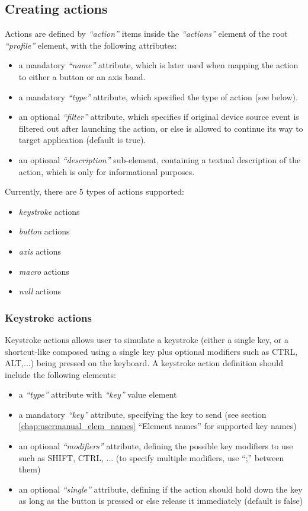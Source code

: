 \subsection{Creating actions}
Actions are defined by \emph{``action''} items inside the \emph{``actions''} element of the root \emph{``profile''} element, with the following attributes:
\begin{itemize}
	\item a mandatory \emph{``name''} attribute, which is later used when mapping the action to either a button or an axis band.
	\item a mandatory \emph{``type''} attribute, which specified the type of action (see below).
	\item an optional \emph{``filter''} attribute, which specifies if original device source event is filtered out after launching the action, or else is allowed to continue its way to target application (default is true).
	\item an optional \emph{``description''} sub-element, containing a textual description of the action, which is only for informational purposes.
\end{itemize}

Currently, there are 5 types of actions supported:
\begin{itemize}
	\item \emph{keystroke} actions
	\item \emph{button} actions
	\item \emph{axis} actions
	\item \emph{macro} actions
	\item \emph{null} actions
\end{itemize}

\subsubsection{Keystroke actions}
Keystroke actions allows user to simulate a keystroke (either a single key, or a shortcut-like composed using a single key plus optional modifiers such as CTRL, ALT,...) being pressed on the keyboard. A keystroke action definition should include the following elements:
\begin{itemize}
	\item a \emph{``type''} attribute with \emph{``key''} value element
	\item a mandatory \emph{``key''} attribute, specifying the key to send (see section \ref{chap:usermanual_elem_names} ``Element names'' for supported key names)
	\item an optional \emph{``modifiers''} attribute, defining the possible key modifiers to use  such as SHIFT, CTRL, ... (to specify multiple modifiers, use ``;'' 	between them)
	\item an optional \emph{``single''} attribute, defining if the action should hold down the key as long as the button is pressed or else release it immediately (default is false)
\end{itemize}

